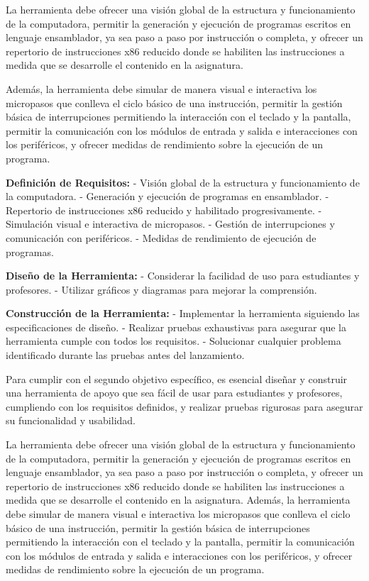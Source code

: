 \documentclass[12pt,twoside]{templates/unerthesis}
\begin{document}
La herramienta debe ofrecer una visión global de la estructura y funcionamiento de la computadora, permitir la generación y ejecución de programas escritos en lenguaje ensamblador, ya sea paso a paso por instrucción o completa, y ofrecer un repertorio de instrucciones x86 reducido donde se habiliten las instrucciones a medida que se desarrolle el contenido en la asignatura.

Además, la herramienta debe simular de manera visual e interactiva los micropasos que conlleva el ciclo básico de una instrucción, permitir la gestión básica de interrupciones permitiendo la interacción con el teclado y la pantalla, permitir la comunicación con los módulos de entrada y salida e interacciones con los periféricos, y ofrecer medidas de rendimiento sobre la ejecución de un programa.

\textbf{Definición de Requisitos:}
- Visión global de la estructura y funcionamiento de la computadora.
- Generación y ejecución de programas en ensamblador.
- Repertorio de instrucciones x86 reducido y habilitado progresivamente.
- Simulación visual e interactiva de micropasos.
- Gestión de interrupciones y comunicación con periféricos.
- Medidas de rendimiento de ejecución de programas.

\textbf{Diseño de la Herramienta:}
- Considerar la facilidad de uso para estudiantes y profesores.
- Utilizar gráficos y diagramas para mejorar la comprensión.

\textbf{Construcción de la Herramienta:}
- Implementar la herramienta siguiendo las especificaciones de diseño.
- Realizar pruebas exhaustivas para asegurar que la herramienta cumple con todos los requisitos.
- Solucionar cualquier problema identificado durante las pruebas antes del lanzamiento.

Para cumplir con el segundo objetivo específico, es esencial diseñar y construir una herramienta de apoyo que sea fácil de usar para estudiantes y profesores, cumpliendo con los requisitos definidos, y realizar pruebas rigurosas para asegurar su funcionalidad y usabilidad.

La herramienta debe ofrecer una visión global de la estructura y funcionamiento de la computadora, permitir la generación y ejecución de programas escritos en lenguaje ensamblador, ya sea paso a paso por instrucción o completa, y ofrecer un repertorio de instrucciones x86 reducido donde se habiliten las instrucciones a medida que se desarrolle el contenido en la asignatura. Además, la herramienta debe simular de manera visual e interactiva los micropasos que conlleva el ciclo básico de una instrucción, permitir la gestión básica de interrupciones permitiendo la interacción con el teclado y la pantalla, permitir la comunicación con los módulos de entrada y salida e interacciones con los periféricos, y ofrecer medidas de rendimiento sobre la ejecución de un programa.
\end{document}
